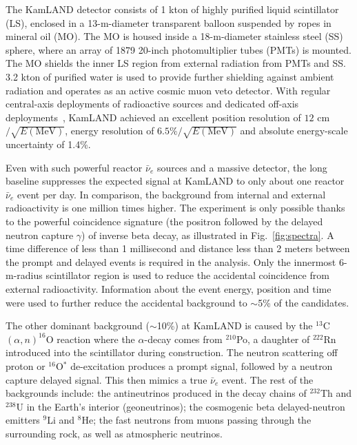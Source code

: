 The KamLAND detector consists of 1 kton of highly purified liquid scintillator (LS), enclosed in a 13-m-diameter transparent balloon suspended by ropes in mineral oil (MO). 
The MO is housed inside a 18-m-diameter stainless steel (SS) sphere, where an array of 1879 20-inch photomultiplier tubes (PMTs) is mounted. 
The MO shields the inner LS region from external radiation from PMTs and SS. 
3.2 kton of purified water is used to provide further shielding against ambient radiation and operates as an active cosmic muon veto detector. 
With regular central-axis deployments of radioactive sources and dedicated off-axis deployments~\cite{KamLAND-4pi}, KamLAND achieved an excellent position resolution of $12$ cm$/\sqrt{E(\textrm{MeV})}$, energy resolution of $6.5\%/\sqrt{E(\textrm{MeV})}$ and absolute energy-scale uncertainty of 1.4\%.

Even with such powerful reactor $\bar\nu_e$ sources and a massive detector, the long baseline suppresses the expected signal at KamLAND to only about one reactor $\bar\nu_e$ event per day. 
In comparison, the background from internal and external radioactivity is one million times higher. 
The experiment is only possible thanks to the powerful coincidence signature (the positron followed by the delayed neutron capture $\gamma$) of inverse beta decay, as illustrated in Fig.~\ref{fig:spectra}. 
A time difference of less than 1 millisecond and distance less than 2 meters between the prompt and delayed events is required in the analysis. 
Only the innermost 6-m-radius scintillator region is used to reduce the accidental coincidence from external radioactivity. 
Information about the event energy, position and time were used to further reduce the accidental background to $\sim$5\% of the candidates.

The other dominant background ($\sim$10\%) at KamLAND is caused by the $^{13}$C$(\alpha,n)^{16}$O reaction where the $\alpha$-decay comes from $^{210}$Po, a daughter of $^{222}$Rn introduced into the scintillator during construction. 
The neutron scattering off proton or $^{16}$O$^*$ de-excitation produces a prompt signal, followed by a neutron capture delayed signal. This then mimics a true $\bar\nu_e$ event. The rest of the backgrounds include: the antineutrinos produced in the decay chains of $^{232}$Th and $^{238}$U in the Earth's interior (geoneutrinos); the cosmogenic beta delayed-neutron emitters $^{9}$Li and $^{8}$He;  the fast neutrons from muons passing through the surrounding rock, as well as atmospheric neutrinos. 

